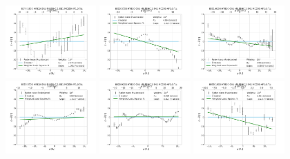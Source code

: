 \begin{figure}
    \includegraphics[width=0.31\textwidth]{Images/WLSFITS/CPSB/8144-1902.png}
    \includegraphics[width=0.31\textwidth]{Images/WLSFITS/CPSB/8315-3703.png}
    \includegraphics[width=0.31\textwidth]{Images/WLSFITS/CPSB/8331-6104.png}
    \includegraphics[width=0.31\textwidth]{Images/WLSFITS/CPSB/8555-3701.png}
    \includegraphics[width=0.31\textwidth]{Images/WLSFITS/CPSB/8623-9102.png}
    \includegraphics[width=0.31\textwidth]{Images/WLSFITS/CPSB/8655-1902.png}

\end{figure}
